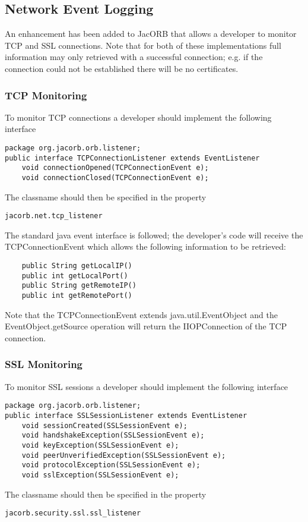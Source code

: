 \subsection{Network Event Logging}
\label{eventLogging}

An enhancement has been added to JacORB that allows a developer to monitor TCP and SSL connections.
Note that for both of these implementations full information may only retrieved with a successful connection;
e.g. if the connection could not be established there will be no certificates.

\subsubsection{TCP Monitoring}

To monitor TCP connections a developer should implement the following interface
\begin{small}
\begin{verbatim}
package org.jacorb.orb.listener;
public interface TCPConnectionListener extends EventListener
    void connectionOpened(TCPConnectionEvent e);
    void connectionClosed(TCPConnectionEvent e);
\end{verbatim}
\end{small}
The classname should then be specified in the property
\begin{verbatim}
jacorb.net.tcp_listener
\end{verbatim}

The standard java event interface is followed; the developer's code will receive the
TCPConnectionEvent which allows the following information to be retrieved:
\begin{small}
\begin{verbatim}
    public String getLocalIP()
    public int getLocalPort()
    public String getRemoteIP()
    public int getRemotePort()
\end{verbatim}
\end{small}
Note that the TCPConnectionEvent extends java.util.EventObject and the EventObject.getSource
operation will return the IIOPConnection of the TCP connection.

\subsubsection{SSL Monitoring}

To monitor SSL sessions a developer should implement the following interface
\begin{small}
\begin{verbatim}
package org.jacorb.orb.listener;
public interface SSLSessionListener extends EventListener
    void sessionCreated(SSLSessionEvent e);
    void handshakeException(SSLSessionEvent e);
    void keyException(SSLSessionEvent e);
    void peerUnverifiedException(SSLSessionEvent e);
    void protocolException(SSLSessionEvent e);
    void sslException(SSLSessionEvent e);
\end{verbatim}
\end{small}
The classname should then be specified in the property
\begin{verbatim}
jacorb.security.ssl.ssl_listener
\end{verbatim}

